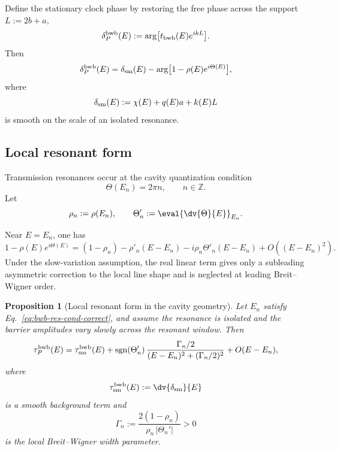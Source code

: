 \documentclass[aps,pra,preprint,notitlepage,nofootinbib]{revtex4-2}
\newtheorem{proposition}{Proposition}
\begin{document}
Define the stationary clock phase by restoring the free phase across the support $L:=2b+a$,
\begin{equation}
\delta_P^{\rm bwb}(E):=\arg\!\big[t_{\rm bwb}(E)e^{ikL}\big].
\label{eq:deltaP-bwb}
\end{equation}
Then
\begin{equation}
\delta_P^{\rm bwb}(E)=
\delta_{\rm sm}(E)
-\arg\!\big[1-\rho(E)e^{i\Theta(E)}\big],
\label{eq:delta-bwb-decomp-correct}
\end{equation}
where
\begin{equation}
\delta_{\rm sm}(E):=\chi(E)+q(E)a+k(E)L
\label{eq:delta-sm-bwb}
\end{equation}
is smooth on the scale of an isolated resonance.

\subsection{Local resonant form}

Transmission resonances occur at the cavity quantization condition
\begin{equation}
\Theta(E_n)=2\pi n,
\qquad n\in\mathbb Z.
\label{eq:bwb-res-cond-correct}
\end{equation}
Let
\begin{equation}
\rho_n:=\rho(E_n),
\qquad
\Theta_n':=\eval{\dv{\Theta}{E}}_{E_n}.
\label{eq:rho-theta-prime}
\end{equation}

Near \(E=E_n\), one has
\begin{equation}
1-\rho(E)e^{i\Theta(E)}
=
(1-\rho_n)-\rho'_n(E-E_n)
-i\rho_n\Theta'_n(E-E_n)
+O\!\left((E-E_n)^2\right).
\label{eq:bwb-den-exp-correct}
\end{equation}
Under the slow-variation assumption, the real linear term gives only a
subleading asymmetric correction to the local line shape and is neglected at
leading Breit--Wigner order.

\begin{proposition}[Local resonant form in the cavity geometry]
Let $E_n$ satisfy Eq.~\eqref{eq:bwb-res-cond-correct}, and assume the resonance is isolated and the barrier amplitudes vary slowly across the resonant window. Then
\begin{equation}
\tau_P^{\rm bwb}(E)
=
\tau_{\rm sm}^{\rm bwb}(E)
+
\operatorname{sgn}(\Theta_n')\,
\frac{\Gamma_n/2}{(E-E_n)^2+(\Gamma_n/2)^2}
+O(E-E_n),
\label{eq:tauP-bwb-BW-safe}
\end{equation}
where
\begin{equation}
\tau_{\rm sm}^{\rm bwb}(E):=\dv{\delta_{\rm sm}}{E}
\end{equation}
is a smooth background term and
\begin{equation}
\Gamma_n:=
\frac{2(1-\rho_n)}{\rho_n\,|\Theta_n'|}>0
\label{eq:Gamma-bwb-safe}
\end{equation}
is the local Breit--Wigner width parameter.
\end{proposition}
\end{document}
